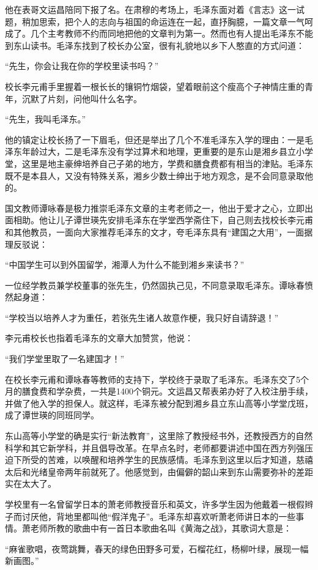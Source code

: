 \documentclass[../../dazhuan.tex]{subfiles}
\begin{document}
他在表哥文运昌陪同下报了名。在肃穆的考场上，毛泽东面对着《言志》这一试题，稍加思索，把个人的志向与祖国的命运连在一起，直抒胸臆，一篇文章一气呵成了。几个主考教师不约而同地把他的文章判为第一。然而也有人提出毛泽东不能到东山读书。毛泽东找到了校长办公室，很有礼貌地以乡下人憨直的方式问道：

“先生，你会让我在你的学校里读书吗？”

校长李元甫手里握着一根长长的镶铜竹烟袋，望着眼前这个瘦高个子神情庄重的青年，沉默了片刻，问他叫什么名字。

“先生，我叫毛泽东。”

他的镇定让校长扬了一下眉毛，但还是举出了几个不准毛泽东入学的理由：一是毛泽东年龄过大，二是毛泽东没有学过算术和地理，更重要的是东山是湘乡县立小学堂，这里是地主豪绅培养自己子弟的地方，学费和膳食费都有相当的津贴。毛泽东既不是本县人，又没有特殊关系，湘乡少数士绅出于地方观念，是不会同意录取他的。

国文教师谭咏春是极力推崇毛泽东文章的主考老师之一，他出于爱才之心，立即出面相助。他让儿子谭世瑛先安排毛泽东在学堂西学斋住下，自己则去找校长李元甫和其他教员，一面向大家推荐毛泽东的文才，夸毛泽东具有“建国之大用”，一面据理反驳说：

“中国学生可以到外国留学，湘潭人为什么不能到湘乡来读书？”

一位经学教员兼学校董事的张先生，仍然固执己见，不同意录取毛泽东。谭咏春愤然起身道：

“学校当以培养人才为重任，若张先生诸人故意作梗，我只好自请辞退！”

李元甫校长也指着毛泽东的文章大加赞赏，他说：

“我们学堂里取了一名建国才！”

在校长李元甫和谭咏春等教师的支持下，学校终于录取了毛泽东。毛泽东交了5个月的膳食费和学杂费，一共是1400个铜元。文运昌又帮表弟办好了入校注册手续，并做了他入学的担保人。就这样，毛泽东被分配到湘乡县立东山高等小学堂戊班，成了谭世瑛的同班同学。

东山高等小学堂的确是实行“新法教育”，这里除了教授经书外，还教授西方的自然科学和其它新学科，并且倡导改革。在早点名时，老师都要讲述中国在西方列强压迫下所受的苦难，以唤醒和培养学生的民族感情。毛泽东到这里以后才知道，慈禧太后和光绪皇帝两年前就死了。他感觉到，由偏僻的韶山来到东山需要弥补的差距实在太大了。

学校里有一名曾留学日本的萧老师教授音乐和英文，许多学生因为他戴着一根假辫子而讨厌他，背地里都叫他“假洋鬼子”。毛泽东却喜欢听萧老师讲日本的一些事情。萧老师所教的歌曲中有一首日本歌曲名叫《黄海之战》，其歌词大意是：

“麻雀歌唱，夜莺跳舞，春天的绿色田野多可爱，石榴花红，杨柳叶绿，展现一幅新画图。”
\end{document}
